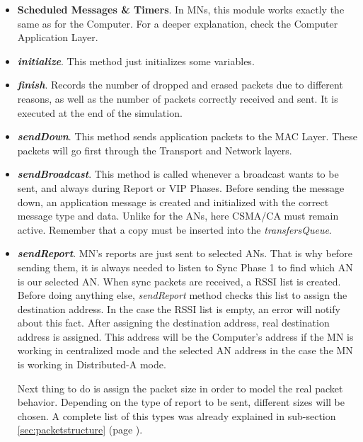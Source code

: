 \begin{itemize}
  \item \textbf{Scheduled Messages \& Timers}. In \acp{MN}, this module works exactly the same as for the Computer. For a deeper explanation, check
  the Computer Application Layer.

  \item \textbf{\textit{initialize}}. This method just initializes some variables.

  \item \textbf{\textit{finish}}. Records the number of dropped and erased packets due to different reasons, as well as the number of packets
  correctly received and sent. It is executed at the end of the simulation.

  \item \textbf{\textit{sendDown}}. This method sends application packets to the \ac{MAC} Layer. These packets will go first through the Transport 
  and Network layers.

  \item \textbf{\textit{sendBroadcast}}. This method is called whenever a broadcast wants to be sent, and always during Report or \ac{VIP} Phases. 
  Before sending the message down, an application message is created and initialized with the correct message type and data. Unlike for the \acp{AN},
  here \ac{CSMA/CA} must remain active. Remember that a copy must be inserted into the \textit{transfersQueue}.

  \item \textbf{\textit{sendReport}}. \ac{MN}'s reports are just sent to selected \acp{AN}. That is why before sending them, it is always needed
  to listen to Sync Phase 1 to find which \ac{AN} is our selected \ac{AN}. When sync packets are received, a \ac{RSSI} list is created. Before 
  doing anything else, \textit{sendReport} method checks this list to assign the destination address. In the case the \ac{RSSI} list is empty, an 
  error will notify about this fact. After assigning the destination address, real destination address is assigned. This address will be 
  the Computer's address if the \ac{MN} is working in centralized mode and the selected \ac{AN} address in the case the \ac{MN} is working in 
  Distributed-A mode.

  Next thing to do is assign the packet size in order to model the real packet behavior. Depending on the type of report to be sent, different 
  sizes will be chosen. A complete list of this types was already explained in sub-section \ref{sec:packetstructure} (page 
  \pageref{sec:packetstructure}).


\end{itemize}
